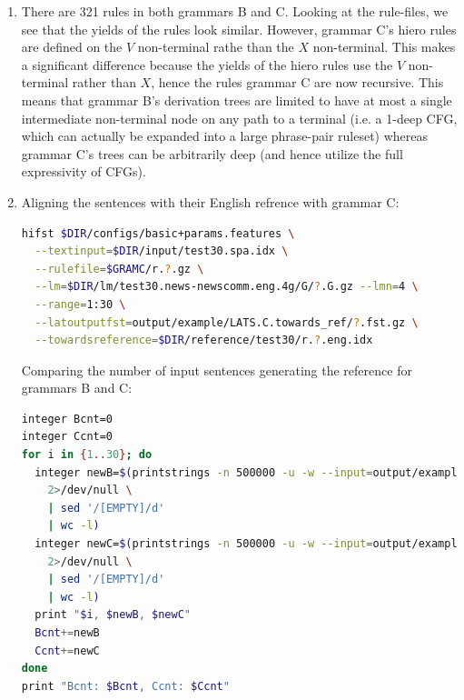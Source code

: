 \documentclass[a4paper,oneside,reqno]{amsart}
\begin{document}
\begin{enumerate}[label=\arabic*.]
  \item There are 321 rules in both grammars B and C. Looking at the
    rule-files, we see that the yields of the rules look similar. However,
    grammar C's hiero rules are defined on the $V$ non-terminal rathe than the
    $X$ non-terminal. This makes a significant difference because the yields of
    the hiero rules use the $V$ non-terminal rather than $X$, hence the rules
    grammar C are now recursive. This means that grammar B's derivation trees
    are limited to have at most a single intermediate non-terminal node on any
    path to a terminal (i.e. a 1-deep CFG, which can actually be expanded into
    a large phrase-pair ruleset) whereas grammar C's trees can be arbitrarily
    deep (and hence utilize the full expressivity of CFGs).

  \item
    Aligning the sentences with their English refrence with grammar C:
    \begin{lstlisting}[language=bash]
hifst $DIR/configs/basic+params.features \
  --textinput=$DIR/input/test30.spa.idx \
  --rulefile=$GRAMC/r.?.gz \
  --lm=$DIR/lm/test30.news-newscomm.eng.4g/G/?.G.gz --lmn=4 \
  --range=1:30 \
  --latoutputfst=output/example/LATS.C.towards_ref/?.fst.gz \
  --towardsreference=$DIR/reference/test30/r.?.eng.idx
    \end{lstlisting}

    Comparing the number of input sentences generating the reference
    for grammars B and C:
    \begin{lstlisting}[language=bash]
integer Bcnt=0
integer Ccnt=0
for i in {1..30}; do
  integer newB=$(printstrings -n 500000 -u -w --input=output/example/LATS.B.towards_ref/$i.fst.gz \
    2>/dev/null \
    | sed '/[EMPTY]/d'
    | wc -l)
  integer newC=$(printstrings -n 500000 -u -w --input=output/example/LATS.C.towards_ref/$i.fst.gz \
    2>/dev/null \
    | sed '/[EMPTY]/d'
    | wc -l)
  print "$i, $newB, $newC"
  Bcnt+=newB
  Ccnt+=newC
done
print "Bcnt: $Bcnt, Ccnt: $Ccnt"
    \end{lstlisting}


\end{enumerate}
\end{document}
